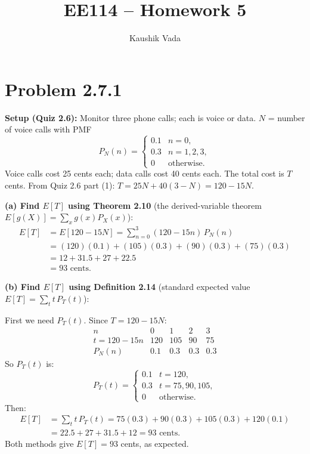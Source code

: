 \documentclass[11pt]{article}
\title{EE114 -- Homework 5}
\author{Kaushik Vada}
\date{}
\begin{document}
\maketitle

\section*{Problem 2.7.1}

\textbf{Setup (Quiz 2.6):} Monitor three phone calls; each is voice or data.
$N$ = number of voice calls with PMF
\[
P_N(n)=\begin{cases}0.1 & n=0,\\0.3 & n=1,2,3,\\0 & \text{otherwise.}\end{cases}
\]
Voice calls cost 25 cents each; data calls cost 40 cents each.
The total cost is $T$ cents. From Quiz 2.6 part (1): $T = 25N + 40(3-N) = 120 - 15N$.

\medskip
\textbf{(a) Find $E[T]$ using Theorem 2.10} (the derived-variable theorem $E[g(X)] = \sum_x g(x)P_X(x)$):
\begin{align*}
E[T] &= E[120-15N] = \sum_{n=0}^{3}(120-15n)\,P_N(n)\\
      &= (120)(0.1)+(105)(0.3)+(90)(0.3)+(75)(0.3)\\
      &= 12 + 31.5 + 27 + 22.5\\
      &= \boxed{93 \text{ cents}}.
\end{align*}

\textbf{(b) Find $E[T]$ using Definition 2.14} (standard expected value $E[T]=\sum_t t\,P_T(t)$):

First we need $P_T(t)$. Since $T=120-15N$:
\[
\begin{array}{c|cccc}
n & 0 & 1 & 2 & 3\\\hline
t=120-15n & 120 & 105 & 90 & 75\\
P_N(n) & 0.1 & 0.3 & 0.3 & 0.3
\end{array}
\]
So $P_T(t)$ is:
\[
P_T(t)=\begin{cases}0.1 & t=120,\\0.3 & t=75,90,105,\\0 & \text{otherwise.}\end{cases}
\]
Then:
\begin{align*}
E[T] &= \sum_t t\,P_T(t) = 75(0.3)+90(0.3)+105(0.3)+120(0.1)\\
      &= 22.5+27+31.5+12 = \boxed{93 \text{ cents}}.
\end{align*}
Both methods give $E[T]=93$ cents, as expected.
\end{document}
